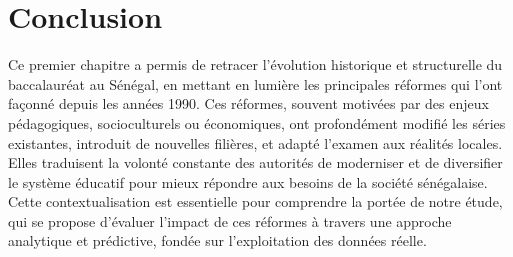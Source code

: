 \section{Conclusion}

Ce premier chapitre a permis de retracer l’évolution historique et structurelle du baccalauréat au Sénégal, en mettant en lumière les principales réformes qui l’ont façonné depuis les années 1990. 
Ces réformes, souvent motivées par des enjeux pédagogiques, socioculturels ou économiques, ont profondément modifié les séries existantes, introduit de nouvelles filières, et adapté l’examen aux réalités locales. 
Elles traduisent la volonté constante des autorités de moderniser et de diversifier le système éducatif pour mieux répondre aux besoins de la société sénégalaise. Cette contextualisation est essentielle pour comprendre la portée de notre étude, 
qui se propose d’évaluer l’impact de ces réformes à travers une approche analytique et prédictive, fondée sur l’exploitation des données réelle.